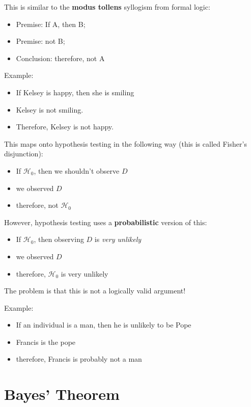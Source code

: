 \documentclass[11pt]{article}
\begin{document}
This is similar to the \textbf{modus tollens} syllogism from formal logic:

\begin{itemize}
\item Premise:  If A, then B;
\item Premise:  not B;
\item Conclusion: therefore, not A
\end{itemize}

Example:
\begin{itemize}
\item If Kelsey is happy, then she is smiling
\item Kelsey is not smiling.
\item Therefore, Kelsey is not happy.
\end{itemize}

This maps onto hypothesis testing in the following way (this is called Fisher's disjunction):

\begin{itemize}
\item If $\mathcal{H}_0$, then we shouldn't observe $D$
\item we observed $D$
\item therefore, not $\mathcal{H}_0$
\end{itemize}

However, hypothesis testing uses a \textbf{probabilistic} version of this:

\begin{itemize}
\item If $\mathcal{H}_0$, then observing $D$ is \emph{very unlikely}
\item we observed $D$
\item therefore, $\mathcal{H}_0$ is very unlikely
\end{itemize}

The problem is that this is not a logically valid argument!

Example:
\begin{itemize}
\item If an individual is a man, then he is unlikely to be Pope
\item Francis is the pope
\item therefore, Francis is probably not a man
\end{itemize}

\section*{Bayes' Theorem}
\label{sec-3}
\end{document}
